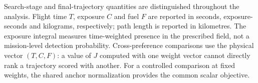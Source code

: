 Search-stage and final-trajectory quantities are distinguished throughout
the analysis. Flight time $T$, exposure $C$ and fuel $F$ are reported in
seconds, exposure-seconds and kilograms, respectively; path length is
reported in kilometres. The exposure integral measures time-weighted
presence in the prescribed field, not a mission-level detection probability.
Cross-preference comparisons use the physical vector $(T,C,F)$: a value
of $J$ computed with one weight vector cannot directly rank a trajectory
scored with another. For a controlled comparison at fixed weights, the
shared anchor normalization provides the common scalar objective.



